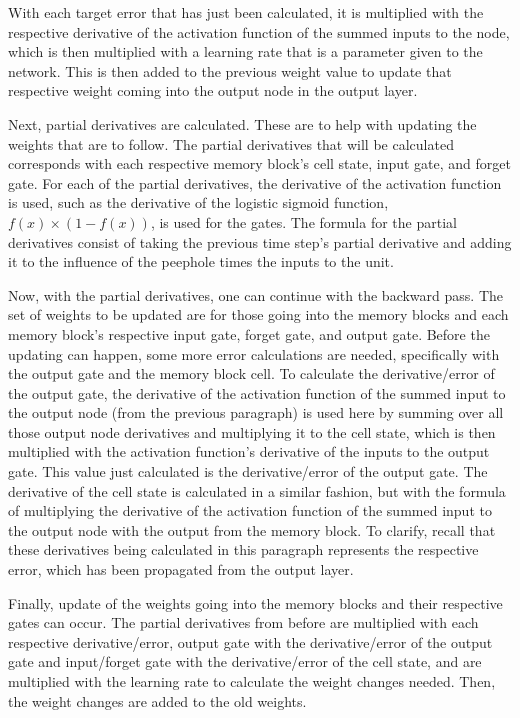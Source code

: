 \documentclass[11pt,letterpaper]{article}
\begin{document}
	With each target error that has just been calculated, it is multiplied with the respective derivative of the activation function of the summed inputs to the node, which is then multiplied with a learning rate that is a parameter given to the network. This is then added to the previous weight value to update that respective weight coming into the output node in the output layer.

	Next, partial derivatives are calculated. These are to help with updating the weights that are to follow. The partial derivatives that will be calculated corresponds with each respective memory block's cell state, input gate, and forget gate. For each of the partial derivatives, the derivative of the activation function is used, such as the derivative of the logistic sigmoid function, $f(x) \times (1 - f(x))$, is used for the gates. The formula for the partial derivatives consist of taking the previous time step's partial derivative and adding it to the influence of the peephole times the inputs to the unit.

	Now, with the partial derivatives, one can continue with the backward pass.
	The set of weights to be updated are for those going into the memory blocks and each memory block's respective input gate, forget gate, and output gate. Before the updating can happen, some more error calculations are needed, specifically with the output gate and the memory block cell. To calculate the derivative/error of the output gate, the derivative of the activation function of the summed input to the output node (from the previous paragraph) is used here by summing over all those output node derivatives and multiplying it to the cell state, which is then multiplied with the activation function's derivative of the inputs to the output gate. This value just calculated is the derivative/error of the output gate. The derivative of the cell state is calculated in a similar fashion, but with the formula of multiplying the derivative of the activation function of the summed input to the output node with the output from the memory block. To clarify, recall that these derivatives being calculated in this paragraph represents the respective error, which has been propagated from the output layer.

	Finally, update of the weights going into the memory blocks and their respective gates can occur. The partial derivatives from before are multiplied with each respective derivative/error, output gate with the derivative/error of the output gate and input/forget gate with the derivative/error of the cell state, and are multiplied with the learning rate to calculate the weight changes needed. Then, the weight changes are added to the old weights.
\end{document}

